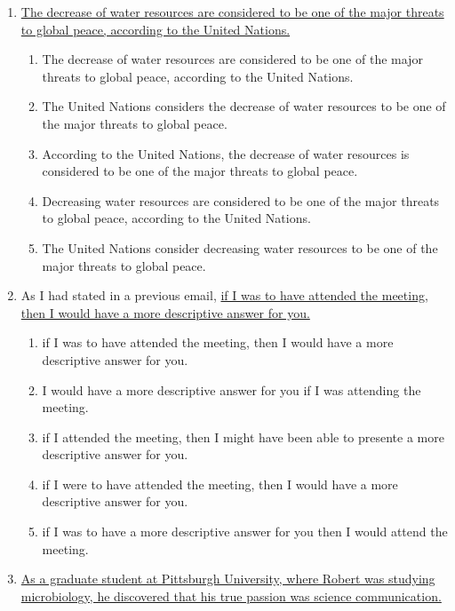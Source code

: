 \begin{enumerate}
\item \ul{The decrease of water resources are considered to be one of the major threats to global peace, according to the United Nations.} 

\bigskip
\begin{enumerate}[label=(\Alph*)]
\item The decrease of water resources are considered to be one of the major threats to global peace, according to the United Nations.
\item The United Nations considers the decrease of water resources to be one of the major threats to global peace.
\item According to the United Nations, the decrease of water resources is considered to be one of the major threats to global peace.
\item Decreasing water resources are considered to be one of the major threats to global peace, according to the United Nations.
\item The United Nations consider decreasing water resources to be one of the major threats to global peace.
\end{enumerate}

\item As I had stated in a previous email, \ul{if I was to have attended the meeting, then I would have a more descriptive answer for you.}

\bigskip
\begin{enumerate}[label=(\Alph*)]
\item if I was to have attended the meeting, then I would have a more descriptive answer for you.
\item I would have a more descriptive answer for you if I was attending the meeting.
\item if I attended the meeting, then I might have been able to presente a more descriptive answer for you. 
\item if I were to have attended the meeting, then I would have a more descriptive answer for you. 
\item  if I was to have a more descriptive answer for you then I would attend the meeting. 
\end{enumerate}

\item \ul{As a graduate student at Pittsburgh University, where Robert was studying microbiology, he discovered that his true passion was science communication.}


\end{enumerate}
